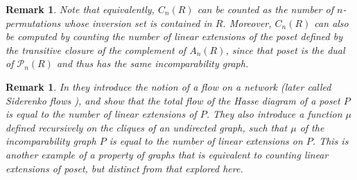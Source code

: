\documentclass[9pt,a4paper,oneside]{article}
\newtheorem{remark}[theorem]{Remark}
\newcommand{\cP}{\mathcal{P}}
\begin{document}
\begin{remark}
Note that equivalently, $C_n(R)$ can be counted as the number of $n$-permutations whose inversion set is contained in $R$.
Moreover, $C_n(R)$ can also be computed by counting the number of linear extensions of the poset defined by the transitive closure of the complement of $A_n(R)$, since that poset is the dual of $\cP_n(R)$ and thus has the same incomparability graph. 
\end{remark}


\begin{remark}
In \cite{Sid91} they introduce the notion of a flow on a network (later called Siderenko flows \cite{Cha23}), and show that the total flow of the Hasse diagram of a poset $P$ is equal to the number of linear extensions of $P$. They also introduce a function $\mu$ defined recursively on the cliques of an undirected graph, such that $\mu$ of the incomparability graph $P$ is equal to the number of linear extensions on $P$. This is another example of a property of graphs that is equivalent to counting linear extensions of poset, but distinct from that explored here.
\end{remark}
\end{document}
